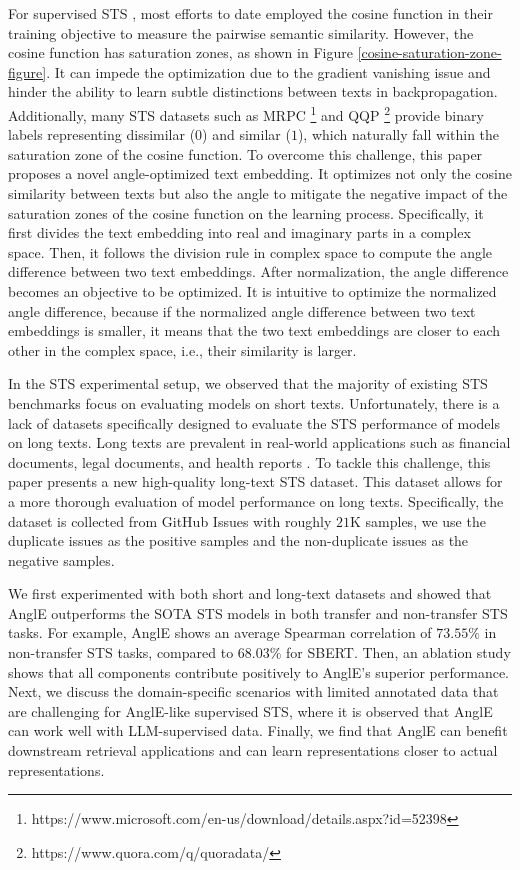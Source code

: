 \documentclass{article} \usepackage{iclr2024_conference,times}
\begin{document}
For supervised STS \citep{sbert-nils-2019,cosent_su_2022}, most efforts to date employed the cosine function in their training objective to measure the pairwise semantic similarity. 
However, the cosine function has saturation zones, as shown in Figure \ref{cosine-saturation-zone-figure}.
It can impede the optimization due to the gradient vanishing issue and hinder the ability to learn subtle distinctions between texts in backpropagation. 
Additionally, many STS datasets such as MRPC \footnote{https://www.microsoft.com/en-us/download/details.aspx?id=52398} and QQP \footnote{https://www.quora.com/q/quoradata/} provide binary labels representing dissimilar ($0$) and similar ($1$), which naturally fall within the saturation zone of the cosine function. 
To overcome this challenge, this paper proposes a novel angle-optimized text embedding. It optimizes not only the cosine similarity between texts but also the angle to mitigate the negative impact of the saturation zones of the cosine function on the learning process. 
Specifically, it first divides the text embedding into real and imaginary parts in a complex space. 
Then, it follows the division rule in complex space to compute the angle difference between two text embeddings. 
After normalization, the angle difference becomes an objective to be optimized. 
It is intuitive to optimize the normalized angle difference, because if the normalized angle difference between two text embeddings is smaller, it means that the two text embeddings are closer to each other in the complex space, i.e., their similarity is larger.


In the STS experimental setup, we observed that the majority of existing STS benchmarks focus on evaluating models on short texts. Unfortunately, there is a lack of datasets specifically designed to evaluate the STS performance of models on long texts. Long texts are prevalent in real-world applications such as financial documents, legal documents, and health reports \citep{li-etal-2023-recurrent}. 
To tackle this challenge, this paper presents a new high-quality long-text STS dataset. This dataset allows for a more thorough evaluation of model performance on long texts. Specifically, the dataset is collected from GitHub Issues with roughly $21$K samples, we use the duplicate issues as the positive samples and the non-duplicate issues as the negative samples.

We first experimented with both short and long-text datasets and showed that AnglE outperforms the SOTA STS models in both transfer and non-transfer STS tasks. 
For example, AnglE shows an average Spearman correlation of $73.55\%$ in non-transfer STS tasks, compared to $68.03\%$ for SBERT.
Then, an ablation study shows that all components contribute positively to AnglE's superior performance.
Next, we discuss the domain-specific scenarios with limited annotated data that are challenging for AnglE-like supervised STS, where it is observed that AnglE can work well with LLM-supervised data.
Finally, we find that AnglE can benefit downstream retrieval applications and can learn representations closer to actual representations.
\end{document}
